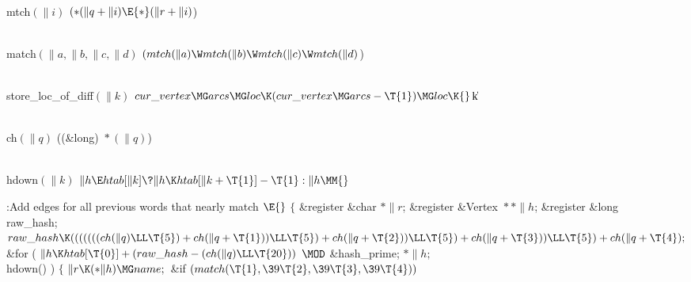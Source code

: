 \Y\B\4\D\\{mtch}$(\|i)$\5
$({*}(\|q+\|i)\E{*}(\|r+\|i){}$)\par
\B\4\D\\{match}$(\|a,\|b,\|c,\|d)$\5
$(\\{mtch}(\|a)\W\\{mtch}(\|b)\W\\{mtch}(\|c)\W\\{mtch}(\|d){}$)\par
\B\4\D\\{store\_loc\_of\_diff}$(\|k)$\5
$\\{cur\_vertex}\MG\\{arcs}\MG\\{loc}\K(\\{cur\_vertex}\MG\\{arcs}-\T{1})\MG%
\\{loc}\K{}$\|k\par
\B\4\D\\{ch}$(\|q)$\5
((\&{long}) ${}{*}(\|q){}$)\par
\B\4\D\\{hdown}$(\|k)$\5
$\|h\E\\{htab}[\|k]\?\|h\K\\{htab}[\|k+\T{1}]-\T{1}:\|h\MM{}$\par
\Y\B\4:Add edges for all previous words  that nearly match %
\X${}\E{}$\6
$\{{}$\5
\&{register} \&{char} ${}{*}\|r{}$;\6
\&{register} \&{Vertex} ${}{*}{*}\|h{}$;\6
\&{register} \&{long} \\{raw\_hash};\7
${}\\{raw\_hash}\K(((((((\\{ch}(\|q)\LL\T{5})+\\{ch}(\|q+\T{1}))\LL\T{5})+%
\\{ch}(\|q+\T{2}))\LL\T{5})+\\{ch}(\|q+\T{3}))\LL\T{5})+\\{ch}(\|q+\T{4});$ %
\&{for} ( $\|h\K\\{htab}[\T{0}]+(\\{raw\_hash}-(\\{ch}(\|q)\LL\T{20}))$ $\MOD$ %
\&{hash\_prime};\7
${}{*}\|h;$ \\{hdown}() ) \6
${}\{{}$\1\6
${}\|r\K({*}\|h)\MG\\{name};{}$\6
\&{if} ${}(\\{match}(\T{1},\39\T{2},\39\T{3},\39\T{4})){}$\1\5
